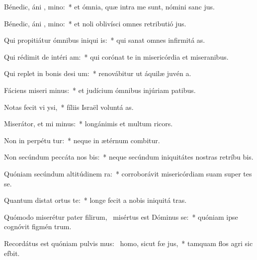 \item Bénedic, áni , mino:~* et ómnia, quæ intra me sunt, nómini sanc jus.
\item Bénedic, áni , mino:~* et noli oblivísci omnes retributió jus.
\item Qui propitiátur ómnibus iniqui is:~* qui sanat omnes infirmitá as.
\item Qui rédimit de intéri  am:~* qui corónat te in misericórdia et miseranibus.
\item Qui replet in bonis desi um:~* renovábitur ut áquilæ juvén a.
\item Fáciens miseri minus:~* et judícium ómnibus injúriam patibus.
\item Notas fecit vi  ysi,~* fíliis Israël voluntá as.
\item Miserátor, et mi minus:~* longánimis et multum ricors.
\item Non in perpétu tur:~* neque in ætérnum combitur.
\item Non secúndum peccáta nos  bis:~* neque secúndum iniquitátes nostras retríbu bis.
\item Quóniam secúndum altitúdinem   ra:~* corroborávit misericórdiam suam super tes se.
\item Quantum distat ortus  te:~* longe fecit a nobis iniquitá tras.
\item Quómodo miserétur pater filirum,~\pscross{} misértus est Dóminus  se:~* quóniam ipse cognóvit figmén trum.
\item Recordátus est quóniam pulvis mus:~\pscross{} homo, sicut fœ  jus,~* tamquam flos agri sic efbit.
